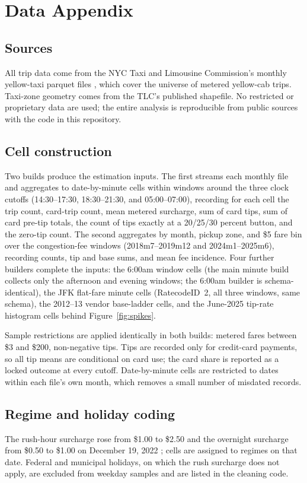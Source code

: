 \section{Data Appendix}
\label{app:empirical}

\subsection{Sources}
All trip data come from the NYC Taxi and Limousine Commission's monthly
yellow-taxi parquet files \parencite{tlc2026trip}, which cover the
universe of metered yellow-cab trips. Taxi-zone geometry comes from the
TLC's published shapefile. No restricted or proprietary data are used;
the entire analysis is reproducible from public sources with the code in
this repository.

\subsection{Cell construction}
Two builds produce the estimation inputs. The first streams each monthly
file and aggregates to date-by-minute cells within windows around the
three clock cutoffs (14:30--17:30, 18:30--21:30, and 05:00--07:00),
recording for each cell the trip count, card-trip count, mean metered
surcharge, sum of card tips, sum of card pre-tip totals, the count of
tips exactly at a 20/25/30 percent button, and the zero-tip count. The
second aggregates by month, pickup zone, and \$5 fare bin over the
congestion-fee windows (2018m7--2019m12 and 2024m1--2025m6), recording
counts, tip and base sums, and mean fee incidence. Four further
builders complete the inputs: the 6:00am window cells (the main minute
build collects only the afternoon and evening windows; the 6:00am
builder is schema-identical), the JFK flat-fare minute cells
(RatecodeID~2, all three windows, same schema), the 2012--13 vendor
base-ladder cells, and the June-2025 tip-rate histogram cells behind
Figure~\ref{fig:spikes}.

Sample restrictions are applied identically in both builds: metered
fares between \$3 and \$200, non-negative tips. Tips are recorded only
for credit-card payments, so all tip means are conditional on card use;
the card share is reported as a locked outcome at every cutoff.
Date-by-minute cells are restricted to dates within each file's own
month, which removes a small number of misdated records.

\subsection{Regime and holiday coding}
The rush-hour surcharge rose from \$1.00 to \$2.50 and the overnight
surcharge from \$0.50 to \$1.00 on December 19, 2022
\parencite{tlc2022notice}; cells are assigned to regimes on that date.
Federal and municipal holidays, on which the rush surcharge does not
apply, are excluded from weekday samples and are listed in the cleaning
code.

